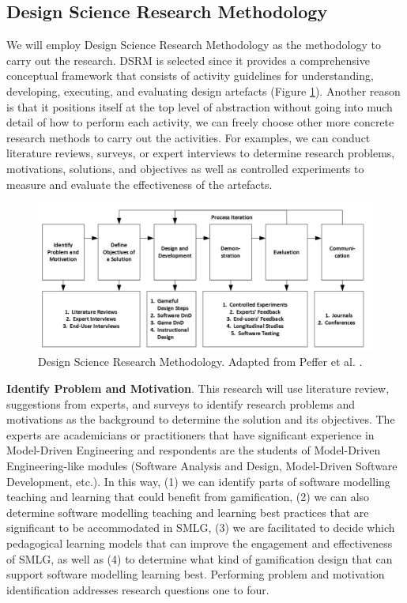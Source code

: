\documentclass[12pt, a4paper]{report}
\begin{document}
{\subsection{Design Science Research Methodology}
We will employ Design Science Research Methodology \cite{peffers2007design} as the methodology to carry out the research. DSRM is selected since it provides a comprehensive conceptual framework that consists of activity guidelines for understanding, developing, executing, and evaluating design artefacts (Figure \ref{dsrm}). Another reason is that it positions itself at the top level of abstraction without going into much detail of how to perform each activity, we can freely choose other more concrete research methods to carry out the activities. For examples, we can conduct literature reviews, surveys, or expert interviews to determine research problems, motivations, solutions, and objectives as well as controlled experiments to measure and evaluate the effectiveness of the artefacts. 

\begin{figure}[ht]
\centering
\includegraphics[width=\textwidth]{dsrm}
\caption{Design Science Research Methodology. Adapted from Peffer et al. \cite{peffers2007design}.}
\label{dsrm}
\end{figure}

\textbf{Identify Problem and Motivation}. This research will use literature review, suggestions from experts, and surveys to identify research problems and motivations as the background to determine the solution and its objectives. The experts are academicians or practitioners that have significant experience in Model-Driven Engineering and respondents are the students of Model-Driven Engineering-like modules (Software Analysis and Design, Model-Driven Software Development, etc.). In this way, (1) we can identify parts of software modelling teaching and learning that could benefit from gamification, (2) we can also determine software modelling teaching and learning best practices that are significant to be accommodated in SMLG, (3) we are facilitated to decide which pedagogical learning models that can improve the engagement and effectiveness of SMLG, as well as (4) to determine what kind of gamification design that can support software modelling learning best. Performing problem and motivation identification addresses research questions one to four.  

}
\end{document}
